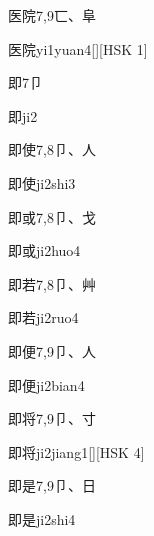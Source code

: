 \begin{entry}{医院}{7,9}{⼖、⾩}
  \begin{phonetics}{医院}{yi1yuan4}[][HSK 1]
  \end{phonetics}
\end{entry}

\begin{entry}{即}{7}{⼙}
  \begin{phonetics}{即}{ji2}
  \end{phonetics}
\end{entry}

\begin{entry}{即使}{7,8}{⼙、⼈}
  \begin{phonetics}{即使}{ji2shi3}
  \end{phonetics}
\end{entry}

\begin{entry}{即或}{7,8}{⼙、⼽}
  \begin{phonetics}{即或}{ji2huo4}
  \end{phonetics}
\end{entry}

\begin{entry}{即若}{7,8}{⼙、⾋}
  \begin{phonetics}{即若}{ji2ruo4}
  \end{phonetics}
\end{entry}

\begin{entry}{即便}{7,9}{⼙、⼈}
  \begin{phonetics}{即便}{ji2bian4}
  \end{phonetics}
\end{entry}

\begin{entry}{即将}{7,9}{⼙、⼨}
  \begin{phonetics}{即将}{ji2jiang1}[][HSK 4]
  \end{phonetics}
\end{entry}

\begin{entry}{即是}{7,9}{⼙、⽇}
  \begin{phonetics}{即是}{ji2shi4}
  \end{phonetics}
\end{entry}

